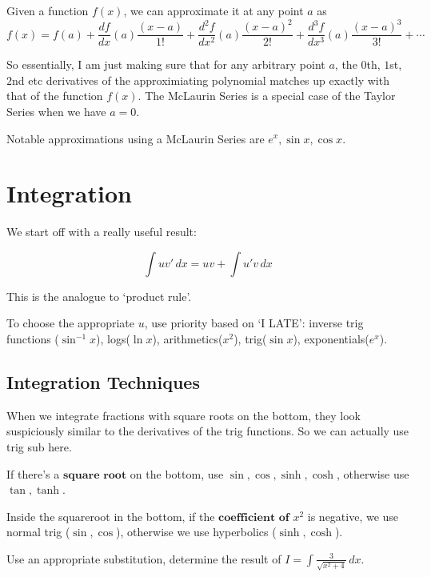 \documentclass{article}
\newcommand{\f}[2]{\frac{#1}{#2}}
\newcommand{\dd}[2]{\frac{d #1}{d #2}}
\renewcommand{\arcsin}{\sin^{-1}}
\newcommand{\intg}[2]{\int #1 \, d#2}
\theoremstyle{mytheoremstyle}
\theoremstyle{mytheoremstyle}
\theoremstyle{myproblemstyle}
\theoremstyle{myproblemstyle}
\begin{document}
    \begin{theorem}
        Given a function $f(x)$, we can approximate it at any point $a$ as
        \[f(x) = f(a) + \dd{f}{x}(a)\f{(x-a)}{1!} + \frac{d^2f}{dx^2}(a)\f{(x-a)^2}{2!} + \frac{d^3f}{dx^3}(a)\f{(x-a)^3}{3!} + \cdots\]
    \end{theorem}

    So essentially, I am just making sure that for any arbitrary point $a$, the $0$th, $1$st, $2$nd etc derivatives of the approximiating polynomial matches up exactly with that of the function $f(x)$. The McLaurin Series is a special case of the Taylor Series when we have $a = 0$. 

    Notable approximations using a McLaurin Series are $e^x, \sin{x}, \cos{x}$. 

    
    \section{Integration}
    We start off with a really useful result:
    \begin{theorem}
        \[\intg{uv'}{x} = uv + \intg{u'v}{x}\] 
    \end{theorem}
    This is the analogue to `product rule'. 

    To choose the appropriate $u$, use priority based on `I LATE': inverse trig functions ($\arcsin{x}$), logs($\ln{x}$), arithmetics($x^2$), trig($\sin{x}$), exponentials($e^x$).
    
    \subsection{Integration Techniques}
    When we integrate fractions with square roots on the bottom, they look suspiciously similar to the derivatives of the trig functions. So we can actually use trig sub here.

    If there's a $\textbf{square root}$ on the bottom, use $\sin, \cos, \sinh, \cosh$, otherwise use $\tan, \tanh$. 

    Inside the squareroot in the bottom, if the $\textbf{coefficient of $x^2$}$ is negative, we use normal trig ($\sin, \cos$), otherwise we use hyperbolics ($\sinh, \cosh$). 

    \begin{example}
        Use an appropriate substitution, determine the result of $I = \intg{\f{3}{\sqrt{x^2 + 4}}}{x}$. 
    \end{example}
    
\end{document}
